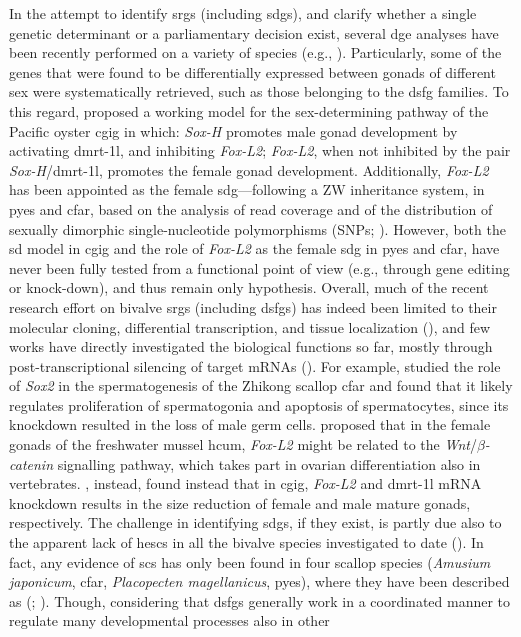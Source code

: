 In the attempt to identify \glspl{srg} (including \glspl{sdg}), and clarify whether a single genetic determinant or a parliamentary decision exist, several \gls{dge} analyses have been recently performed on a variety of species (e.g., ). Particularly, some of the genes that were found to be differentially expressed between gonads of different sex were systematically retrieved, such as those belonging to the \gls{dsfg} families. To this regard,  proposed a working model for the sex-determining pathway of the Pacific oyster \gls{cgig} in which: \textit{Sox-H} promotes male gonad development by activating \gls{dmrt-1l}, and inhibiting \textit{Fox-L2}; \textit{Fox-L2}, when not inhibited by the pair \textit{Sox-H}/\gls{dmrt-1l}, promotes the female gonad development. Additionally, \textit{Fox-L2} has been appointed as the female \gls{sdg}---following a ZW inheritance system, in \gls{pyes} and \gls{cfar}, based on the analysis of read coverage and of the distribution of sexually dimorphic single-nucleotide polymorphisms (SNPs; ). However, both the \gls{sd} model in \gls{cgig} and the role of \textit{Fox-L2} as the female \gls{sdg} in \gls{pyes} and \gls{cfar}, have never been fully tested from a functional point of view (e.g., through gene editing or knock-down), and thus remain only hypothesis. Overall, much of the recent research effort on bivalve \glspl{srg} (including \glspl{dsfg}) has indeed been limited to their molecular cloning, differential transcription, and tissue localization (), and few works have directly investigated the biological functions so far, mostly through post-transcriptional silencing of target mRNAs (). For example,  studied the role of \textit{Sox2} in the spermatogenesis of the Zhikong scallop \gls{cfar} and found that it likely regulates proliferation of spermatogonia and apoptosis of spermatocytes, since its knockdown resulted in the loss of male germ cells.  proposed that in the female gonads of the freshwater mussel \gls{hcum}, \textit{Fox-L2} might be related to the \textit{Wnt}/\textit{$\beta$-catenin} signalling pathway, which takes part in ovarian differentiation also in vertebrates. , instead, found instead that in \gls{cgig}, \textit{Fox-L2} and \gls{dmrt-1l} mRNA knockdown results in the size reduction of female and male mature gonads, respectively. The challenge in identifying \glspl{sdg}, if they exist, is partly due also to the apparent lack of \glspl{hesc} in all the bivalve species investigated to date (). In fact, any evidence of \glspl{sc} has only been found in four scallop species (\textit{Amusium japonicum}, \gls{cfar}, \textit{Placopecten magellanicus}, \gls{pyes}), where they have been described as  (; ). Though, considering that \glspl{dsfg} generally work in a coordinated manner to regulate many developmental processes also in other 